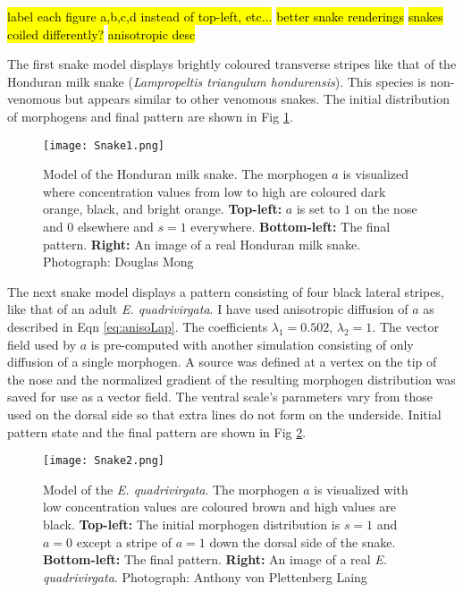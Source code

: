 \hl{label each figure a,b,c,d instead of top-left, etc...}
\hl{better snake renderings}
\hl{snakes coiled differently?}
\hl{anisotropic desc}

The first snake model displays brightly coloured transverse stripes like that of the Honduran milk snake (\textit{Lampropeltis triangulum hondurensis}). This species is non-venomous but appears similar to other venomous snakes. The initial distribution of morphogens and final pattern are shown in Fig \ref{fig:Snake1}.

\begin{figure}[ht]
	\centering
	\texttt{[image: Snake1.png]}
	\caption{Model of the Honduran milk snake. The morphogen $a$ is visualized where concentration values from low to high are coloured dark orange, black, and bright orange. \textbf{Top-left:} $a$ is set to $1$ on the nose and $0$ elsewhere and $s=1$ everywhere. \textbf{Bottom-left:} The final pattern. \textbf{Right:} An image of a real Honduran milk snake. \textcolor{citation-gray}{Photograph: Douglas Mong}}
	\label{fig:Snake1}
\end{figure}

The next snake model displays a pattern consisting of four black lateral stripes, like that of an adult \textit{E. quadrivirgata}. I have used anisotropic diffusion of $a$ as described in Eqn \ref{eq:anisoLap}. The coefficients $\lambda_{1}=0.502$, $\lambda_{2}=1$. The vector field used by $a$ is pre-computed with another simulation consisting of only diffusion of a single morphogen. A source was defined at a vertex on the tip of the nose and the normalized gradient of the resulting morphogen distribution was saved for use as a vector field. The ventral scale's parameters vary from those used on the dorsal side so that extra lines do not form on the underside. Initial pattern state and the final pattern are shown in Fig \ref{fig:Snake2}.

\begin{figure}[ht]
	\centering
	\texttt{[image: Snake2.png]}
	\caption{Model of the \textit{E. quadrivirgata}. The morphogen $a$ is visualized with low concentration values are coloured brown and high values are black. \textbf{Top-left:} The initial morphogen distribution is $s=1$ and $a=0$ except a stripe of $a=1$ down the dorsal side of the snake. \textbf{Bottom-left:} The final pattern. \textbf{Right:} An image of a real \textit{E. quadrivirgata}. \textcolor{citation-gray}{Photograph: Anthony von Plettenberg Laing}}
	\label{fig:Snake2}
\end{figure}

